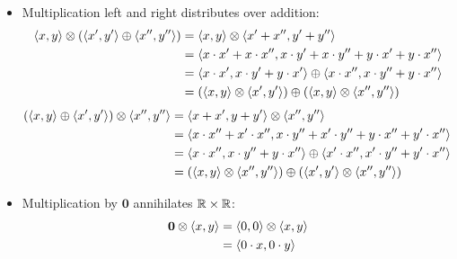 \documentclass[a4paper,12pt]{ETHexercise}
\begin{document}
\begin{question}
\begin{subquestion}
\begin{itemize}
      \item Multiplication left and right distributes over addition:
            \begin{align}
              {\langle x , y \rangle} \otimes \left({\langle x' , y' \rangle} \oplus {\langle x'' , y'' \rangle}\right) & = {\langle x , y \rangle} \otimes {\langle x' + x'' , y' + y'' \rangle}                                                          \\
                                                                                    & = {\langle x \cdot x' + x \cdot x'' , x \cdot y' + x \cdot y'' + y \cdot x' + y \cdot x'' \rangle}                   \\
                                                                                    & = {\langle x \cdot x' , x \cdot y' + y \cdot x' \rangle} \oplus {\langle x \cdot x'' , x \cdot y'' + y \cdot x'' \rangle}        \\
                                                                                    & = \left({\langle x , y \rangle} \otimes {\langle x' , y' \rangle}\right) \oplus \left({\langle x , y \rangle} \otimes {\langle x'' , y'' \rangle}\right)
            \end{align}
            \begin{align}
              \left({\langle x , y \rangle} \oplus {\langle x' , y' \rangle}\right) \otimes {\langle x'' , y'' \rangle} & = {\langle x + x' , y + y' \rangle} \otimes {\langle x'' , y'' \rangle}                                                              \\
                                                                                    & = {\langle x \cdot x'' + x' \cdot x'' , x \cdot y'' + x' \cdot y'' + y \cdot x'' + y' \cdot x'' \rangle}                 \\
                                                                                    & = {\langle x \cdot x'' , x \cdot y'' + y \cdot x'' \rangle} \oplus {\langle x' \cdot x'' , x' \cdot y'' + y' \cdot x'' \rangle}      \\
                                                                                    & = \left({\langle x , y \rangle} \otimes {\langle x'' , y'' \rangle}\right) \oplus \left({\langle x' , y' \rangle} \otimes {\langle x'' , y'' \rangle}\right)
            \end{align}
      \item Multiplication by $\mathbf{0}$ annihilates $\mathbb{R} \times \mathbb{R}$:
            \begin{align}
              \mathbf{0} \otimes \pair{x}{y} & = \pair{0}{0} \otimes \pair{x}{y}       \\
                                             & = \pair{0 \cdot x}{0 \cdot y}           \\

\end{align}
\end{itemize}
\end{subquestion}
\end{question}
\end{document}
